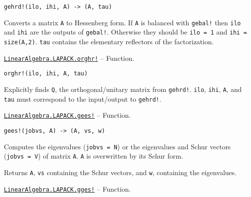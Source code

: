 \begin{adjustwidth}{2em}{0pt}


\begin{verbatim}
gehrd!(ilo, ihi, A) -> (A, tau)
\end{verbatim}

Converts a matrix \texttt{A} to Hessenberg form. If \texttt{A} is balanced with \texttt{gebal!} then \texttt{ilo} and \texttt{ihi} are the outputs of \texttt{gebal!}. Otherwise they should be \texttt{ilo = 1} and \texttt{ihi = size(A,2)}. \texttt{tau} contains the elementary reflectors of the factorization.



\end{adjustwidth}
\hypertarget{17531257454072185780}{}
\hyperlink{17531257454072185780}{\texttt{LinearAlgebra.LAPACK.orghr!}}  -- {Function.}

\begin{adjustwidth}{2em}{0pt}


\begin{verbatim}
orghr!(ilo, ihi, A, tau)
\end{verbatim}

Explicitly finds \texttt{Q}, the orthogonal/unitary matrix from \texttt{gehrd!}. \texttt{ilo}, \texttt{ihi}, \texttt{A}, and \texttt{tau} must correspond to the input/output to \texttt{gehrd!}.



\end{adjustwidth}
\hypertarget{7554800805540125473}{}
\hyperlink{7554800805540125473}{\texttt{LinearAlgebra.LAPACK.gees!}}  -- {Function.}

\begin{adjustwidth}{2em}{0pt}


\begin{verbatim}
gees!(jobvs, A) -> (A, vs, w)
\end{verbatim}

Computes the eigenvalues (\texttt{jobvs = N}) or the eigenvalues and Schur vectors (\texttt{jobvs = V}) of matrix \texttt{A}. \texttt{A} is overwritten by its Schur form.

Returns \texttt{A}, \texttt{vs} containing the Schur vectors, and \texttt{w}, containing the eigenvalues.



\end{adjustwidth}
\hypertarget{9858205807823882594}{}
\hyperlink{9858205807823882594}{\texttt{LinearAlgebra.LAPACK.gges!}}  -- {Function.}

